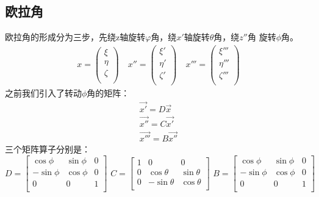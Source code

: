 \documentclass[UTF8,10pt]{article}
\begin{document}
\subsection{欧拉角}
欧拉角的形成分为三步，先绕z轴旋转$\varphi$角，绕$x'$轴旋转$\theta$角，绕$z''$角
旋转$\phi$角。
\begin{gather*}
    x=\left( \begin{array}{c}
        \xi   \\
        \eta  \\
        \zeta \\
    \end{array} \right)
    \quad
    x''=\left( \begin{array}{c}
        \xi'   \\
        \eta'  \\
        \zeta' \\
    \end{array} \right)
    \quad
    x'''=\left( \begin{array}{c}
        \xi'''   \\
        \eta'''  \\
        \zeta''' \\
    \end{array} \right)
\end{gather*}
之前我们引入了转动$\phi$角的矩阵：
\begin{gather*}
    \vec{x'}=D \vec{x}\\
    \vec{x''}=C \vec{x'} \\
    \vec{x'''}=B \vec{x''}
\end{gather*}
三个矩阵算子分别是：
$$
    D=\left[ \begin{matrix}
            \cos \phi  & \sin \phi & 0 \\
            -\sin \phi & \cos \phi & 0 \\
            0          & 0         & 1 \\
        \end{matrix} \right] \,\, C=\left[ \begin{matrix}
            1 & 0            & 0           \\
            0 & \cos \theta  & \sin \theta \\
            0 & -\sin \theta & \cos \theta \\
        \end{matrix} \right] \,\,B=\left[ \begin{matrix}
            \cos \phi  & \sin \phi & 0 \\
            -\sin \phi & \cos \phi & 0 \\
            0          & 0         & 1 \\
        \end{matrix} \right]
$$
\end{document}
